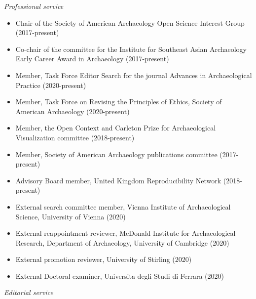 \medskip

\noindent\emph{Professional service\vspace{0.01in}}

\medskip

\begin{itemize}[noitemsep, font=$\bullet$\scshape\bfseries]

\item Chair of the Society of American Archaeology Open Science Interest Group (2017-present)

\item Co-chair of the committee for the Institute for Southeast Asian Archaeology Early Career Award in Archaeology (2017-present)

\item Member, Task Force Editor Search for the journal Advances in Archaeological Practice (2020-present)

\item Member, Task Force on Revising the Principles of Ethics, Society of American Archaeology (2020-present)

\item Member, the Open Context and Carleton Prize for Archaeological Visualization committee (2018-present)

\item Member, Society of American Archaeology publications committee (2017-present)

\item Advisory Board member, United Kingdom Reproducibility Network (2018-present)

\item External search committee member, Vienna Institute of Archaeological Science, University of Vienna (2020)

\item External reappointment reviewer, McDonald Institute for Archaeological Research, Department of Archaeology, University of Cambridge (2020)

\item External promotion reviewer, University of Stirling (2020)

\item External Doctoral examiner, Universita degli Studi di Ferrara (2020)

\end{itemize}

\medskip

\noindent\emph{Editorial service\vspace{0.01in}}

